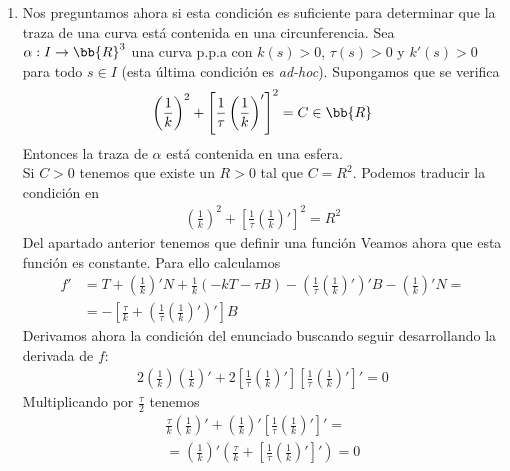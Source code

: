 \begin{ejercicio}
\begin{enumerate}
        \item[7 bis.] Nos preguntamos ahora si esta condición es suficiente para determinar que la traza de una curva está contenida en una circunferencia. Sea $\alpha: I \to \bb{R}^3$ una curva p.p.a con $k(s)>0$, $\tau(s)>0$ y $k'(s)>0$ para todo $s\in I$ (esta última condición es \textit{ad-hoc}). Supongamos que se verifica
        \begin{gather*}
            \left(\frac{1}{k}\right)^2 + \left[\frac{1}{\tau}\left(\frac{1}{k}\right)'\right]^2 = C \in \bb{R}
        \end{gather*}
        Entonces la traza de $\alpha$ está contenida en una esfera.\\

        Si $C>0$ tenemos que existe un $R>0$ tal que $C = R^2$. Podemos traducir la condición en 
        \begin{gather*}
            \left(\frac{1}{k}\right)^2 + \left[\frac{1}{\tau}\left(\frac{1}{k}\right)'\right]^2 = R^2
        \end{gather*}
        Del apartado anterior tenemos que definir una función
        Veamos ahora que esta función es constante. Para ello calculamos 
        \begin{align*}
            f' &= T + \left(\frac{1}{k}\right)' N + \frac{1}{k}(-k T - \tau B) - \left(\frac{1}{\tau}\left(\frac{1}{k}\right)'\right)'B - \left(\frac{1}{k}\right)' N =\\
            &= - \left[ \frac{\tau}{k} + \left(\frac{1}{\tau}\left(\frac{1}{k}\right)'\right)' \right]B
        \end{align*}
        Derivamos ahora la condición del enunciado buscando seguir desarrollando la derivada de $f$:
        \begin{gather*}
            2 \left(\frac{1}{k}\right) \left(\frac{1}{k}\right)' + 2 \left[\frac{1}{\tau} \left(\frac{1}{k}\right)'\right]\left[\frac{1}{\tau} \left(\frac{1}{k}\right)'\right]' = 0
        \end{gather*}
        Multiplicando por $\frac{\tau}{2}$ tenemos 
        \begin{gather*}
            \frac{\tau}{k} \left(\frac{1}{k}\right)' +  \left(\frac{1}{k}\right)'\left[\frac{1}{\tau} \left(\frac{1}{k}\right)'\right]' = \\
            = \left(\frac{1}{k}\right)' \left(\frac{\tau}{k} + \left[\frac{1}{\tau} \left(\frac{1}{k}\right)' \right]'\right) = 0
        \end{gather*}

\end{enumerate}
\end{ejercicio}

